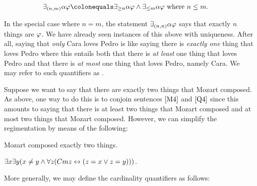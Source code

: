 \vspace{-.2in}
\begin{align*}
  \qt{\exists_{(n,m)}}{\alpha}\metaA &\colonequals \qt{\exists_{\geq n}}{\alpha}\metaA \eand \qt{\exists_{\leq m}}{\alpha}\metaA \text{ where } n\leq m.
\end{align*}
\vspace{-.2in}

In the special case where $n=m$, the statement $\exists_{(n,n)} \alpha\varphi$ says that exactly $n$ things are $\varphi$. 
We have already seen instances of this above with uniqueness.
After all, saying that \textit{only} Cara loves Pedro is like saying there is \textit{exactly one} thing that loves Pedro where this entails both that there is \textit{at least} one thing that loves Pedro and that there is \textit{at most} one thing that loves Pedro, namely Cara.
We may refer to such quantifiers as .

Suppose we want to say that there are exactly two things that Mozart composed.
As above, one way to do this is to conjoin sentences $\ref{M4}$ and $\ref{Q4}$ since this amounts to saying that there is at least two things that Mozart composed and at most two things that Mozart composed. 
However, we can simplify the regimentation by means of the following:

\begin{earg}
  \item[\ex{Q7}] Mozart composed exactly two things.
  \item[\ex{Q8}] $\exists x\exists y(x \neq y \wedge \forall z(Cmz \leftrightarrow (z = x \vee z = y)))$.
\end{earg}

More generally, we may define the cardinality quantifiers as follows:

